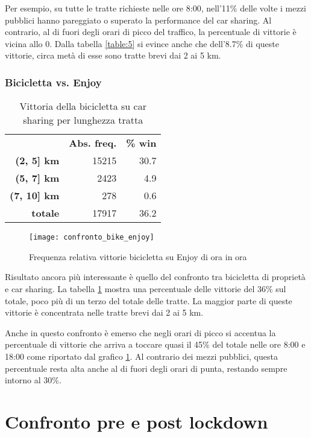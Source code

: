 Per esempio, su tutte le tratte richieste nelle ore 8:00, nell'11\% delle volte i mezzi pubblici hanno pareggiato o superato la performance del car sharing. Al contrario, al di fuori degli orari di picco del traffico, la percentuale di vittorie è vicina allo 0. Dalla tabella \ref{table:5} si evince anche che dell'8.7\% di queste vittorie, circa metà di esse sono tratte brevi dai 2 ai 5 km.

\subsubsection{Bicicletta vs. Enjoy}

\begin{table}[H]
\centering
\begin{tabular}{ | r r r | }
\hline
& \textbf{Abs. freq.} & \textbf{\% win} \\
\textbf{(2, 5] km} & 15215 & 30.7 \\
\textbf{(5, 7] km} & 2423 & 4.9 \\
\textbf{(7, 10] km} & 278 & 0.6 \\
\hline
\textbf{totale} & 17917 & 36.2 \\
\hline
\end{tabular}
\caption{Vittoria della bicicletta su car sharing per lunghezza tratta}
\label{table:6}
\end{table}

\begin{figure}[H]
\texttt{[image: confronto\_bike\_enjoy]}
\caption{Frequenza relativa vittorie bicicletta su Enjoy di ora in ora}
\label{image:14}
\end{figure}

Risultato ancora più interessante è quello del confronto tra bicicletta di proprietà e car sharing. La tabella \ref{table:6} mostra una percentuale delle vittorie del 36\% sul totale, poco più di un terzo del totale delle tratte. La maggior parte di queste vittorie è concentrata nelle tratte brevi dai 2 ai 5 km.

Anche in questo confronto è emerso che negli orari di picco si accentua la percentuale di vittorie che arriva a toccare quasi il 45\% del totale nelle ore 8:00 e 18:00 come riportato dal grafico \ref{image:14}. Al contrario dei mezzi pubblici, questa percentuale resta alta anche al di fuori degli orari di punta, restando sempre intorno al 30\%.

\section{Confronto pre e post lockdown}

